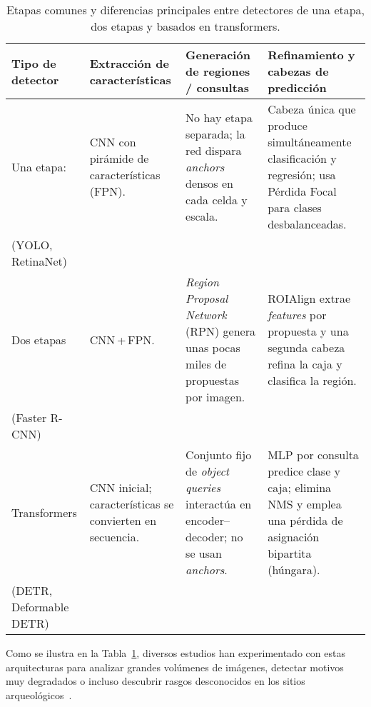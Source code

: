 \begin{table}[htbp]
\centering
\caption{Etapas comunes y diferencias principales entre detectores de una etapa, dos etapas y basados en transformers.}
\label{tab:detector_stages}
\renewcommand{\arraystretch}{1.2} %
\begin{tabular}{|p{2.9cm}|p{3.2cm}|p{4.0cm}|p{4.0cm}|}
\hline
\textbf{Tipo de detector} &
\textbf{Extracción de características} &
\textbf{Generación de regiones / consultas} &
\textbf{Refinamiento y cabezas de predicción} \\ \hline
Una etapa: &
CNN con pirámide de características (FPN). &
No hay etapa separada; la red dispara \emph{anchors} densos en cada celda y escala. &
Cabeza única que produce simultáneamente clasificación y regresión; usa Pérdida Focal para clases desbalanceadas. \\
(YOLO, RetinaNet) & & & \\ \hline
Dos etapas &
CNN\,+\,FPN. &
\emph{Region Proposal Network} (RPN) genera unas pocas miles de propuestas por imagen. &
ROIAlign extrae \emph{features} por propuesta y una segunda cabeza refina la caja y clasifica la región. \\
(Faster R-CNN) & & & \\ \hline
Transformers &
CNN inicial; características se convierten en secuencia. &
Conjunto fijo de \emph{object queries} interactúa en encoder–decoder; no se usan \emph{anchors}. &
MLP por consulta predice clase y caja; elimina NMS y emplea una pérdida de asignación bipartita (húngara). \\
(DETR, Deformable DETR) & & & \\ \hline
\end{tabular}
\end{table}

Como se ilustra en la Tabla~\ref{tab:detector_stages}, diversos estudios han experimentado con estas arquitecturas para analizar grandes volúmenes de imágenes, detectar motivos muy degradados o incluso descubrir rasgos desconocidos en los sitios arqueológicos~\cite{horn2022,jalandoni2022,suhaimi2023}.

